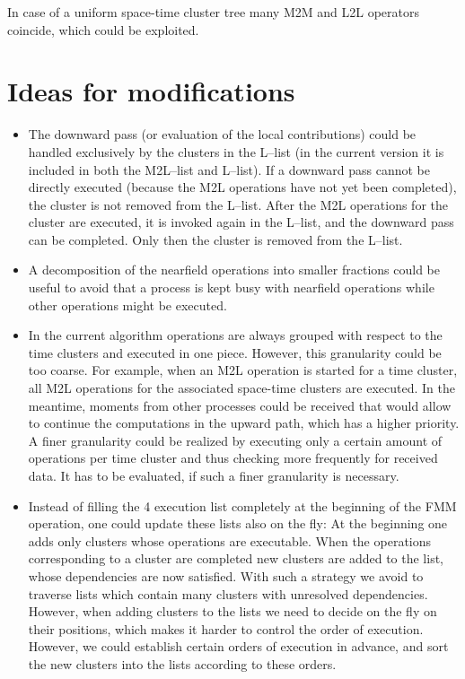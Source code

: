 \documentclass[a4paper,11pt]{article}
\theoremstyle{plain}
\theoremstyle{definition}
\theoremstyle{remark}
\begin{document}
In case of a uniform space-time cluster tree many M2M and L2L operators coincide, which could be exploited.

\section{Ideas for modifications}
\begin{itemize}
  \item The downward pass (or evaluation of the local contributions) could be handled exclusively by the clusters in the L--list (in the current version it is included in both the M2L--list and L--list). If a downward pass cannot be directly executed (because the M2L operations have not yet been completed), the cluster is not removed from the L--list. After the M2L operations for the cluster are executed, it is invoked again in the L--list, and the downward pass can be completed. Only then the cluster is removed from the L--list.
  \item A decomposition of the nearfield operations into smaller fractions could be useful to avoid that a process is kept busy with nearfield operations while other operations might be executed.
  \item In the current algorithm operations are always grouped with respect to the time clusters and executed in one piece. However, this granularity could be too coarse. For example, when an M2L operation is started for a time cluster, all M2L operations for the associated space-time clusters are executed. In the meantime, moments from other processes could be received that would allow to continue the computations in the upward path, which has a higher priority. A finer granularity could be realized by executing only a certain amount of operations per time cluster and thus checking more frequently for received data. It has to be evaluated, if such a finer granularity is necessary.
  \item Instead of filling the 4 execution list completely at the beginning of the FMM operation, one could update these lists also on the fly: At the beginning one adds only clusters whose operations are executable. When the operations corresponding to a cluster are completed new clusters are added to the list, whose dependencies are now satisfied. With such a strategy we avoid to traverse lists which contain many clusters with unresolved dependencies. However, when adding clusters to the lists we need to decide on the fly on their positions, which makes it harder to control the order of execution. However, we could establish certain orders of execution in advance, and sort the new clusters into the lists according to these orders.
\end{itemize}
\end{document}
